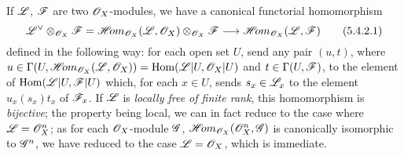 \begin{env}[5.4.2]
\label{0.5.4.2}
If $\mathscr{L}$, $\mathscr{F}$ are two $\mathscr{O}_X$-modules, we have a canonical functorial
homomorphism
\[
  {\mathscr{L}}^\vee\otimes_{\mathscr{O}_X}\mathscr{F}
  =\mathscr{H}\!{om}_{\mathscr{O}_X}(\mathscr{L},\mathscr{O}_X)\otimes_{\mathscr{O}_X}\mathscr{F}
  \longrightarrow\mathscr{H}\!{om}_{\mathscr{O}_X}(\mathscr{L},\mathscr{F})
  \tag{5.4.2.1}
\]
defined in the following way: for each open set $U$, send any pair $(u,t)$,
where $u\in\Gamma(U,\mathscr{H}\!{om}_{\mathscr{O}_X}(\mathscr{L},\mathscr{O}_X))={\mathop{\mathrm{Hom}}\nolimits}(\mathscr{L}|U,\mathscr{O}_X|U)$ and
$t\in\Gamma(U,\mathscr{F})$, to the element of ${\mathop{\mathrm{Hom}}\nolimits}(\mathscr{L}|U,\mathscr{F}|U)$ which, for
each $x\in U$, sends $s_x\in\mathscr{L}_x$ to the element $u_x(s_x)t_x$ of
$\mathscr{F}_x$. If $\mathscr{L}$ is {\em locally free of finite rank}, this homomorphism
is {\em bijective}; the property being local, we can in fact reduce to the case
where $\mathscr{L}=\mathscr{O}_X^n$; as for each $\mathscr{O}_X$-module $\mathscr{G}$,
$\mathscr{H}\!{om}_{\mathscr{O}_X}(\mathscr{O}_X^n,\mathscr{G})$ is canonically isomorphic to $\mathscr{G}^n$, we
have reduced to the case $\mathscr{L}=\mathscr{O}_X$, which is immediate.
\end{env}

